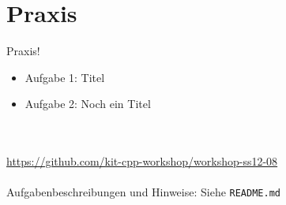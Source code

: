 \section{Praxis}
\begin{frame}[fragile]{Praxis!}
	\begin{itemize}
		\item Aufgabe 1: Titel
		\item Aufgabe 2: Noch ein Titel
	\end{itemize}
	\ \\
	\ \\
	\large{\url{https://github.com/kit-cpp-workshop/workshop-ss12-08}} \\
	\ \\
	Aufgabenbeschreibungen und Hinweise: Siehe \verb|README.md|

\end{frame}

